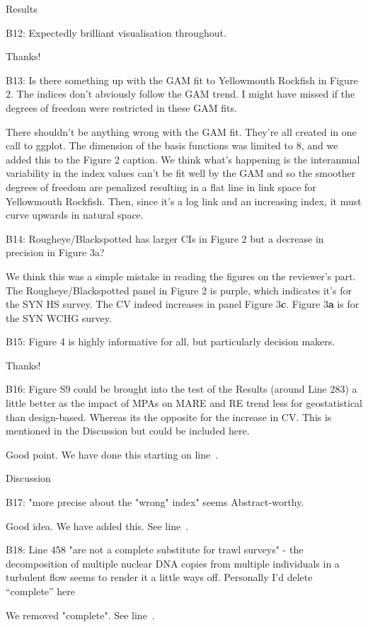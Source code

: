 \documentclass[12pt]{article}
\newcommand{\rev}[1]{{\color{niceblue} #1}}
\newcommand{\lr}[1]{line~\lineref{#1}}
\begin{document}

\rev{Results}

\rev{B12: Expectedly brilliant visualisation throughout.}

Thanks!

\rev{B13: Is there something up with the GAM fit to Yellowmouth Rockfish in Figure 2. The indices don’t abviously follow the GAM trend. I might have missed if the degrees of freedom were restricted in these GAM fits.}

There shouldn't be anything wrong with the GAM fit. They're all created in one call to ggplot. The dimension of the basis functions was limited to 8, and we added this to the Figure 2 caption. We think what's happening is the interannual variability in the index values can't be fit well by the GAM and so the smoother degrees of freedom are penalized resulting in a flat line in link space for Yellowmouth Rockfish. Then, since it's a log link and an increasing index, it must curve upwards in natural space.

\rev{B14: Rougheye/Blackspotted has larger CIs in Figure 2 but a decrease in precision in
Figure 3a?}

We think this was a simple mistake in reading the figures on the reviewer's part. The Rougheye/Blackspotted panel in Figure 2 is purple, which indicates it's for the SYN HS survey. The CV indeed increases in panel Figure 3\textbf{c}. Figure 3\textbf{a} is for the SYN WCHG survey.

\rev{B15: Figure 4 is highly informative for all, but particularly decision makers.}

Thanks!

\rev{B16: Figure S9 could be brought into the test of the Results (around Line 283) a little better as the impact of MPAs on MARE and RE trend less for geostatistical than design-based. Whereas its the opposite for the increase in CV. This is mentioned in the Discussion but could be included here.}

Good point. We have done this starting on \lr{B16}.

\rev{Discussion}

\rev{B17: "more precise about the "wrong" index" seems Abstract-worthy.}

Good idea. We have added this. See \lr{B17}.

\rev{B18: Line 458 "are not a complete substitute for trawl surveys" - the decomposition of multiple nuclear DNA copies from multiple individuals in a turbulent flow seems to render it a little ways off. Personally I’d delete ``complete'' here}

We removed "complete". See \lr{B18}.
\end{document}
